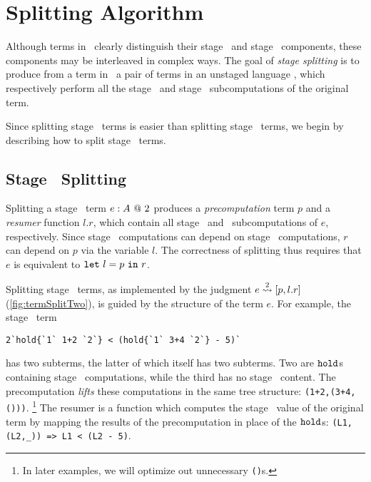 \section{Splitting Algorithm}
\label{sec:splitting}

Although terms in \lang\ clearly distinguish their stage \bbone\ and stage
\bbtwo\ components, these components may be interleaved in complex ways. The
goal of \emph{stage splitting} is to produce from a term in \lang\ a pair of
terms in an unstaged language \langmono, which respectively perform all the
stage \bbone\ and stage \bbtwo\ subcomputations of the original term.

Since splitting stage \bbtwo\ terms is easier than splitting stage \bbone\ terms, 
we begin by describing how to split stage \bbtwo\ terms.

\subsection {Stage \bbtwo\ Splitting}

Splitting a stage \bbtwo\ term ${e}:{A}~@~ 2$ produces a \emph{precomputation}
term $p$ and a \emph{resumer} function $l.r$, which contain all stage \bbone\
and \bbtwo\ subcomputations of $e$, respectively. Since stage \bbtwo\
computations can depend on stage \bbone\ computations, $r$ can depend on $p$ via the variable
$l$. The correctness of splitting thus requires that $e$ is equivalent to
${\tt let}~{l} = {p}~{\tt in}~{r}$.


Splitting stage \bbtwo\ terms, as implemented by the judgment $e \overset{ 2}\rightsquigarrow [p,l.r]$
(\cref{fig:termSplitTwo}), is guided by the structure of the term $e$. 
For example, the stage \bbtwo\ term
\begin{lstlisting}
2`hold{`1` 1+2 `2`} < (hold{`1` 3+4 `2`} - 5)`
\end{lstlisting}
has two subterms, the latter of which itself has two subterms. Two are ${\tt hold}$s
containing stage \bbone\ computations, while the third has no stage \bbone\
content. The precomputation \emph{lifts} these computations in the same tree
structure: \verb|(1+2,(3+4,()))|.%
\footnote{In later examples, we will optimize out unnecessary \texttt{()}s.}
The resumer is a function which computes the stage \bbtwo\ value of the original
term by mapping the results of the precomputation in place of the ${\tt hold}$s:
\verb|(L1,(L2,_)) => L1 < (L2 - 5)|. 

